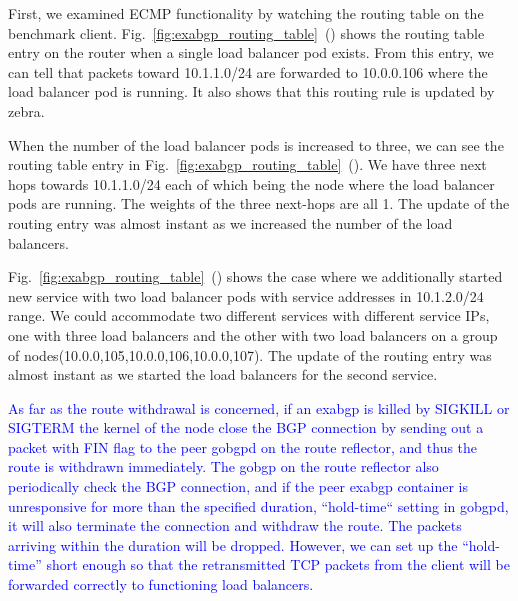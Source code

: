 First, we examined ECMP functionality by watching the routing table on the benchmark client.
Fig.~\ref{fig:exabgp_routing_table}~() shows the routing table entry on the router when a single load balancer pod exists.
From this entry, we can tell that packets toward 10.1.1.0/24 are forwarded to 10.0.0.106 where the load balancer pod is running.
It also shows that this routing rule is updated by zebra.

When the number of the load balancer pods is increased to three, we can see the routing table entry in Fig.~\ref{fig:exabgp_routing_table}~().
We have three next hops towards 10.1.1.0/24 each of which being the node where the load balancer pods are running.
The weights of the three next-hops are all 1.
The update of the routing entry was almost instant as we increased the number of the load balancers.

Fig.~\ref{fig:exabgp_routing_table}~() shows the case where we additionally started new service with two load balancer pods with service addresses in 10.1.2.0/24 range.
We could accommodate two different services with different service IPs, one with three load balancers and the other with two load balancers on a group of nodes(10.0.0,105,10.0.0,106,10.0.0,107).
The update of the routing entry was almost instant as we started the load balancers for the second service.

\textcolor{blue}{
As far as the route withdrawal is concerned, if an exabgp is killed by SIGKILL or SIGTERM the kernel of the node close the BGP connection by sending out a packet with FIN flag to the peer gobgpd on the route reflector, and thus the route is withdrawn immediately.
The gobgp on the route reflector also periodically check the BGP connection, and if the peer exabgp container is unresponsive for more than the specified duration, “hold-time“ setting in gobgpd, it will also terminate the connection and withdraw the route.
The packets arriving within the duration will be dropped.
However, we can set up the “hold-time” short enough so that the retransmitted TCP packets from the client will be forwarded correctly to functioning load balancers.
}

